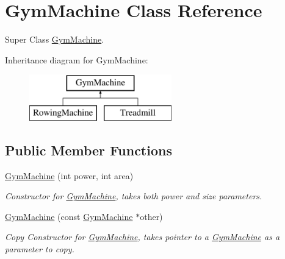 \hypertarget{class_gym_machine}{}\section{Gym\+Machine Class Reference}
\label{class_gym_machine}


Super Class \hyperlink{class_gym_machine}{Gym\+Machine}.  


Inheritance diagram for Gym\+Machine\+:\begin{figure}[H]
\begin{center}
\leavevmode
\includegraphics[height=2.000000cm]{class_gym_machine}
\end{center}
\end{figure}
\subsection*{Public Member Functions}
\begin{DoxyCompactItemize}
\item 
\hypertarget{class_gym_machine_a85345b529a91c02b60ccb43bf9d554a4}{}\hyperlink{class_gym_machine_a85345b529a91c02b60ccb43bf9d554a4}{Gym\+Machine} (int power, int area)\label{class_gym_machine_a85345b529a91c02b60ccb43bf9d554a4}

\begin{DoxyCompactList}\small\item\em Constructor for \hyperlink{class_gym_machine}{Gym\+Machine}, takes both power and size parameters. \end{DoxyCompactList}\item 
\hypertarget{class_gym_machine_a80c7858fd921a01e91457dc1fb3383ad}{}\hyperlink{class_gym_machine_a80c7858fd921a01e91457dc1fb3383ad}{Gym\+Machine} (const \hyperlink{class_gym_machine}{Gym\+Machine} $\ast$other)\label{class_gym_machine_a80c7858fd921a01e91457dc1fb3383ad}

\begin{DoxyCompactList}\small\item\em Copy Constructor for \hyperlink{class_gym_machine}{Gym\+Machine}, takes pointer to a \hyperlink{class_gym_machine}{Gym\+Machine} as a parameter to copy. \end{DoxyCompactList}\end{DoxyCompactItemize}
